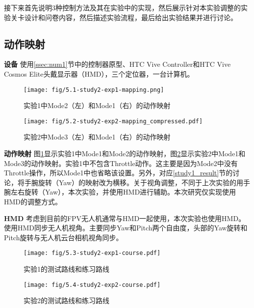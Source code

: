 接下来首先说明3种控制方法及其在实验中的实现，然后展示针对本实验调整的实验关卡设计和问卷内容，然后描述实验流程，最后给出实验结果并进行讨论。

\subsection{动作映射}

\textbf{设备}\hspace{1pt}
使用\ref{ssec:num1}节中的控制器原型、HTC Vive Controller和HTC Vive Cosmos Elite头戴显示器（HMD），三个定位器，一台计算机。

\begin{figure}[t]
    \centering
    \texttt{[image: fig/5.1-study2-exp1-mapping.png]}
    \caption{实验1中Mode2（左）和Mode1（右）的动作映射}
    \label{fig:exp1_mode1_and_mode2}
\end{figure}

\begin{figure}[t]
    \centering
    \texttt{[image: fig/5.2-study2-exp2-mapping\_compressed.pdf]}
    \caption{实验2中Mode3（左）和Mode1（右）的动作映射}
    \label{fig:exp2_mode1_and_mode3}
\end{figure}

\textbf{动作映射}\hspace{1pt}
图\ref{fig:exp1_mode1_and_mode2}显示实验1中Mode1和Mode2的动作映射，图\ref{fig:exp2_mode1_and_mode3}显示实验2中Mode1和Mode3的动作映射。实验1中不包含Throttle动作。这主要是因为Mode2中没有Throttle操作，所以Mode1中也省略该设置。另外，对应\ref{study1_result}节的讨论，将手腕旋转（Yaw）的映射改为横移。关于视角调整，不同于上次实验的用手腕左右旋转（Yaw），本次实验，并使用HMD进行辅助。本次研究仅实现使用HMD的调整方式。

\textbf{HMD}\hspace{1pt}
考虑到目前的FPV无人机通常与HMD一起使用，本次实验也使用HMD。使用HMD同步无人机视角。主要同步Yaw和Pitch两个自由度，头部的Yaw旋转和Pitch旋转与无人机云台相机视角同步。


\begin{figure}[t]
    \vspace{-2em}
    \centering
    \texttt{[image: fig/5.3-study2-exp1-course.pdf]}
    \caption{实验1的测试路线和练习路线}
    \label{fig:study2-exp1-course}
\end{figure}

\begin{figure}[t]
    \centering
    \texttt{[image: fig/5.4-study2-exp2-course.pdf]}
    \caption{实验2的测试路线和练习路线}
    \label{fig:study2-exp2-course}
\end{figure}

